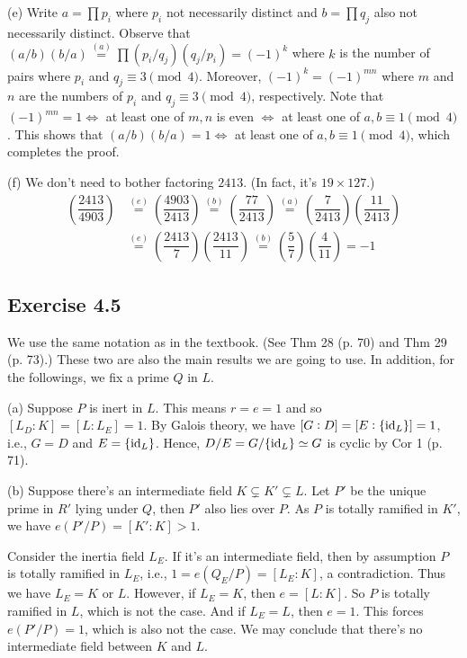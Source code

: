 \documentclass[../Marcus.tex]{subfiles}
\begin{document}
(e) Write $a=\prod p_i$ where $p_i$ not necessarily distinct and $b=\prod q_j$ also not necessarily distinct. Observe that $(a/b)(b/a)\overset{(a)}{=}\prod (p_i/q_j)(q_j/p_i)=(-1)^k$ where $k$ is the number of pairs where $p_i$ and $q_j\equiv 3\pmod{4}$. Moreover, $(-1)^k=(-1)^{mn}$ where $m$ and $n$ are the numbers of $p_i$ and $q_j\equiv 3\pmod{4}$, respectively. Note that $(-1)^{mn}=1 \iff$ at least one of $m,n$ is even $\iff$ at least one of $a,b\equiv 1\pmod{4}$. This shows that $(a/b)(b/a)=1 \iff$ at least one of $a,b\equiv 1\pmod{4}$, which completes the proof.

(f) We don't need to bother factoring $2413$. (In fact, it's $19\times 127$.)
\begin{align*}
\left(\dfrac{2413}{4903}\right) &\overset{(e)}{=} \left(\dfrac{4903}{2413}\right) \overset{(b)}{=} \left(\dfrac{77}{2413}\right) \overset{(a)}{=} \left(\dfrac{7}{2413}\right)\left(\dfrac{11}{2413}\right) \\ &\overset{(e)}{=} \left(\dfrac{2413}{7}\right)\left(\dfrac{2413}{11}\right) \overset{(b)}{=} \left(\dfrac{5}{7}\right)\left(\dfrac{4}{11}\right) = -1
\end{align*}


\subsection*{Exercise 4.5}

We use the same notation as in the textbook. (See Thm 28 (p. 70) and Thm 29 (p. 73).) These two are also the main results we are going to use. In addition, for the followings, we fix a prime $Q$ in $L$.

(a) Suppose $P$ is inert in $L$. This means $r=e=1$ and so $[L_D:K]=[L:L_E]=1$. By Galois theory, we have $[G:D]=[E:\{\operatorname{id}_L\}]=1$, i.e., $G=D$ and $E=\{\operatorname{id}_L\}$. Hence, $D/E=G/\{\operatorname{id}_L\}\simeq G$ is cyclic by Cor 1 (p. 71).

(b) Suppose there's an intermediate field $K\varsubsetneq K'\varsubsetneq L$. Let $P'$ be the unique prime in $R'$ lying under $Q$, then $P'$ also lies over $P$. As $P$ is totally ramified in $K'$, we have $e(P'/P)=[K':K]>1$.

Consider the inertia field $L_E$. If it's an intermediate field, then by assumption $P$ is totally ramified in $L_E$, i.e., $1=e(Q_E/P)=[L_E:K]$, a contradiction. Thus we have $L_E=K$ or $L$. However, if $L_E=K$, then $e=[L:K]$. So $P$ is totally ramified in $L$, which is not the case. And if $L_E=L$, then $e=1$. This forces $e(P'/P)=1$, which is also not the case. We may conclude that there's no intermediate field between $K$ and $L$.
\end{document}
